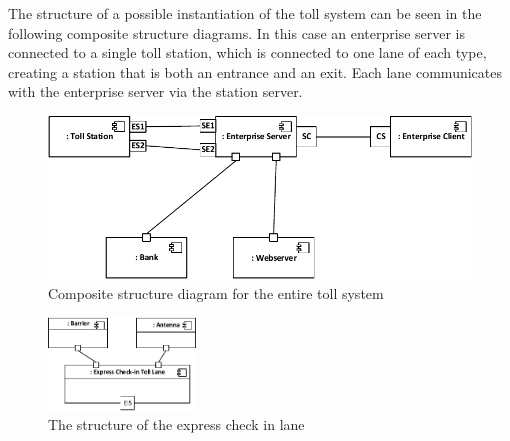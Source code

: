 The structure of a possible instantiation of the toll system can be seen in the following composite structure diagrams. In this case an enterprise server is connected to a single toll station, which is connected to one lane of each type, creating a station that is both an entrance and an exit. Each lane communicates with the enterprise server via the station server.
\\
\begin{figure}[H]
\centerline{\includegraphics[width=\textwidth]{img/composite_structure_diagram/cscd_enterprise}}
\caption{Composite structure diagram for the entire toll system}
\label{fig:csd_e}
\end{figure}


\begin{figure}[H]
\centerline{\includegraphics[width=0.35\textwidth]{img/composite_structure_diagram/cscd_toll_lane_express_in}}
\caption{The structure of the express check in lane}
\label{fig:csd_tlei}
\end{figure}

